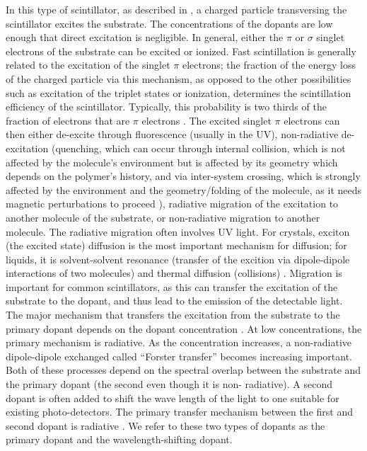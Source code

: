 In this type of scintillator, as described in \cite{birks}, 
a charged particle transversing the scintillator
excites the substrate.  The concentrations of the 
dopants are low enough that direct excitation is negligible.
In general, either the $\pi$ or $\sigma$ singlet electrons of the substrate
can be excited or ionized. 
Fast scintillation is generally related
to the excitation of the singlet $\pi$ electrons; the fraction
of the energy loss of the charged particle via this mechanism,
as opposed to the other possibilities such as excitation of
the triplet states or ionization, determines the scintillation
efficiency of the scintillator.  Typically, this probability is
two thirds of the fraction of electrons that are $\pi$ electrons \cite{birks}.
The excited singlet $\pi$ electrons can then either de-excite
through fluorescence (usually in the UV), 
non-radiative de-excitation (quenching, which can occur through internal collision, which is not affected by the molecule's environment
but is affected by its geometry which depends on the
polymer's history, and 
via inter-system crossing, which is strongly affected by 
the environment and the geometry/folding of the molecule,
as it needs magnetic perturbations to proceed \cite{brown}),
radiative migration of the excitation to another molecule
of the substrate, or non-radiative migration
to another molecule.  The radiative migration often involves UV light.
For crystals, exciton (the excited state)
diffusion  is the most important mechanism for
diffusion; for liquids, it is solvent-solvent resonance (transfer of the
excition via dipole-dipole interactions of two molecules)
and thermal diffusion (collisions)
\cite{birks}.
Migration is important for common scintillators, as this can transfer
the excitation of the substrate to the dopant, and 
thus lead to the emission
of the detectable light.  
The major mechanism that transfers the excitation from the substrate to the
primary dopant depends on the dopant concentration \cite{sauli}.  
At low concentrations, the primary mechanism is radiative.  As the
concentration increases, a non-radiative dipole-dipole exchanged
called ``Forster transfer''\cite{forster} becomes increasing important.  Both
of these processes depend on the spectral overlap between the
substrate and the primary dopant (the second even though it is non-
radiative).
A second dopant is often added to
shift the wave length of 
the light to one suitable for existing photo-detectors.
The primary transfer mechanism between the first and second 
dopant is radiative \cite{sauli}.
We refer to these two types of dopants 
as the primary dopant and the wavelength-shifting dopant.


